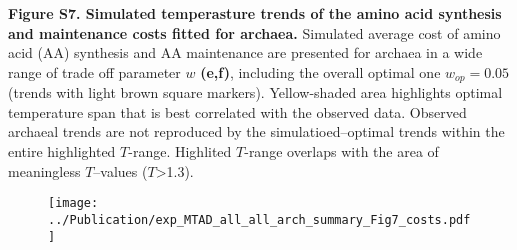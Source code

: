 \documentclass{report}
\begin{document}
{\bf Figure S7. Simulated temperasture trends of the amino acid synthesis and maintenance costs fitted for archaea.}
Simulated average cost of amino acid (AA) synthesis and AA maintenance are presented for archaea in a wide range of trade off parameter $w$ {\bf (e,f)}, including the overall optimal one $w_{op}=0.05$ (trends with light brown square markers). Yellow-shaded area highlights optimal temperature span that is best correlated with the observed data. Observed archaeal trends are not reproduced by the simulatioed--optimal trends within the entire highlighted $T$-range. Highlited $T$-range overlaps with the area of meaningless $T$--values ($T$\textgreater1.3).

\begin{figure}[h!]
	\centering
	\texttt{[image: ../Publication/exp\_MTAD\_all\_all\_arch\_summary\_Fig7\_costs.pdf]}
\end{figure}
\end{document}
